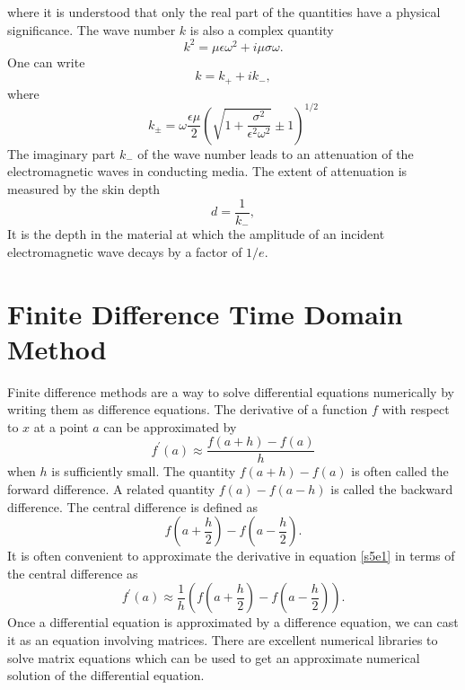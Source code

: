 \documentclass[11pt]{article}
\numberwithin{equation}{section}
\newcommand{\opr}{\prime}
\begin{document}
where it is understood that only the real part of the quantities have a 
physical significance. The wave number $k$ is also a complex quantity
\begin{equation}\label{s4e17}
k^2 = \mu\epsilon\omega^2 + i\mu\sigma\omega.
\end{equation}
One can write
\begin{equation}\label{s4e18}
k = k_+ + ik_-,
\end{equation}
where
\begin{equation}\label{s4e19}
k_\pm = \omega\frac{\epsilon\mu}{2}
\left(\sqrt{1 + \frac{\sigma^2}{\epsilon^2\omega^2}} \pm 1\right)^{1/2}
\end{equation}
The imaginary part $k_-$ of the wave number leads to an attenuation of the
electromagnetic waves in conducting media. The extent of attenuation is 
measured by the skin depth
\begin{equation}\label{s4e20}
d = \frac{1}{k_-},
\end{equation}
It is the depth in the material at which the amplitude of an incident
electromagnetic wave decays by a factor of $1/e$.

\section{Finite Difference Time Domain Method}\label{s5}
Finite difference methods are a way to solve differential equations numerically
by writing them as difference equations. The derivative of a function $f$
with respect to $x$ at a point $a$ can be approximated by
\begin{equation}\label{s5e1}
f^\opr(a) \approx \frac{f(a+h) - f(a)}{h}
\end{equation}
when $h$ is sufficiently small. The quantity $f(a+h) - f(a)$ is often called
the forward difference. A related quantity $f(a) - f(a - h)$ is called the
backward difference. The central difference is defined as
\[
f\left(a + \frac{h}{2}\right) - f\left(a - \frac{h}{2}\right).
\]
It is often convenient to approximate the derivative in equation \eqref{s5e1}
in terms of the central difference as
\begin{equation}\label{s5e2}
f^\opr(a) \approx \frac{1}{h}
\left(f\left(a + \frac{h}{2}\right) - f\left(a - \frac{h}{2}\right)\right).
\end{equation}
Once a differential equation is approximated by a difference equation, we can 
cast it as an equation involving matrices. There are excellent numerical
libraries to solve matrix equations which can be used to get an approximate
numerical solution of the differential equation.
\end{document}
